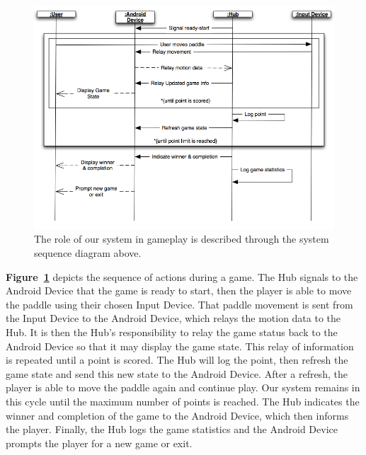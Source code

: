 \documentclass[12pt]{article}
\begin{document}
\begin{figure}
\begin{center}
\includegraphics[scale=.5]{ssd_GamePlay_1.png}
\caption{\label{ssd_GamePlay_1}The role of our system in gameplay is described through the system sequence diagram above.}
\end{center}
\end{figure}

\textbf{Figure~\ref{ssd_GamePlay_1}} depicts the sequence of actions during a game.  The Hub signals to the Android Device that the game is ready to start, then the player is able to move the paddle using their chosen Input Device.  That paddle movement is sent from the Input Device to the Android Device, which relays the motion data to the Hub.  It is then the Hub's responsibility to relay the game status back to the Android Device so that it may display the game state.  This relay of information is repeated until a point is scored.  The Hub will log the point, then refresh the game state and send this new state to the Android Device.  After a refresh, the player is able to move the paddle again and continue play.  Our system remains in this cycle until the maximum number of points is reached.  The Hub indicates the winner and completion of the game to the Android Device, which then informs the player.  Finally, the Hub logs the game statistics and the Android Device prompts the player for a new game or exit.
\end{document}
